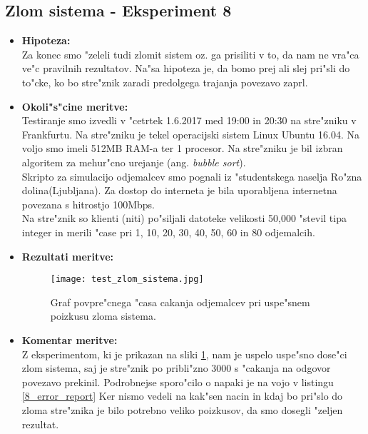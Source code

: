 \subsection{Zlom sistema - Eksperiment 8}
    \begin{itemize}
    	\item \textbf{Hipoteza: }  \\
    		Za konec smo "zeleli tudi zlomit sistem oz. ga prisiliti v to, da nam ne vra"ca ve"c pravilnih rezultatov. Na"sa hipoteza je, da bomo prej ali slej pri"sli do to"cke, ko bo stre"znik zaradi predolgega trajanja povezavo zaprl. 
    			
    	\item \textbf{Okoli"s"cine meritve: } \\
    			Testiranje smo izvedli v "cetrtek 1.6.2017 med 19:00 in 20:30 na stre"zniku v Frankfurtu. Na stre"zniku je tekel operacijski sistem Linux Ubuntu 16.04. Na voljo smo imeli 512MB RAM-a ter 1 procesor. Na stre"zniku je bil izbran algoritem za mehur"cno urejanje (ang. \textit{bubble sort}).\\ Skripto za simulacijo odjemalcev smo pognali iz "studentskega naselja Ro"zna dolina(Ljubljana). Za dostop do interneta je bila uporabljena internetna povezana s hitrostjo 100Mbps.\\ Na stre"znik so klienti (niti) po"siljali datoteke velikosti 50,000  "stevil tipa integer in merili "case pri 1, 10, 20, 30, 40, 50, 60 in 80 odjemalcih.
    
     	\item \textbf{Rezultati meritve: }  \\
    		\begin{figure}[h!]
  		\centering
  		  \texttt{[image: test\_zlom\_sistema.jpg]}
  		\caption{Graf povpre"cnega "casa cakanja odjemalcev pri uspe"snem poizkusu zloma sistema. }
  		\label{8_graf_zlom_sistema}
		\end{figure}
    		 \newpage
    	\item \textbf{Komentar meritve: } \\ 
    		Z eksperimentom, ki je prikazan na sliki \ref{8_graf_zlom_sistema}, nam je uspelo uspe"sno dose"ci zlom sistema, saj je stre"znik po pribli"zno 3000 s "cakanja na odgovor povezavo prekinil. Podrobnejse sporo"cilo o napaki je na vojo v listingu \ref{8_error_report}
		Ker nismo vedeli na kak"sen nacin in kdaj bo pri"slo do zloma stre"znika je bilo potrebno veliko poizkusov, da smo dosegli "zeljen rezultat. 
	

\end{itemize}
